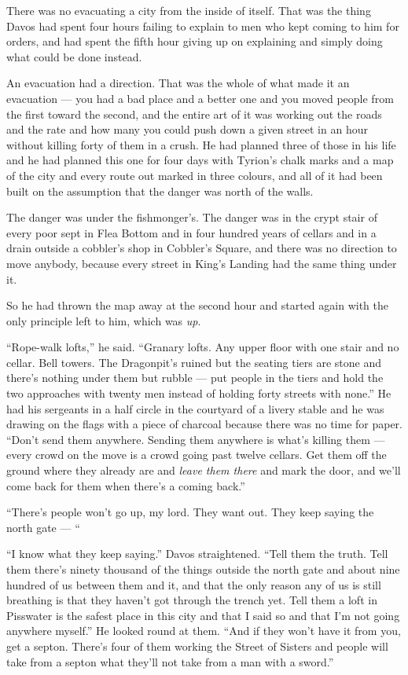 There was no evacuating a city from the inside of itself. That was the thing Davos had spent four hours failing to explain to men who kept coming to him for orders, and had spent the fifth hour giving up on explaining and simply doing what could be done instead.

An evacuation had a direction. That was the whole of what made it an evacuation — you had a bad place and a better one and you moved people from the first toward the second, and the entire art of it was working out the roads and the rate and how many you could push down a given street in an hour without killing forty of them in a crush. He had planned three of those in his life and he had planned this one for four days with Tyrion’s chalk marks and a map of the city and every route out marked in three colours, and all of it had been built on the assumption that the danger was north of the walls.

The danger was under the fishmonger’s. The danger was in the crypt stair of every poor sept in Flea Bottom and in four hundred years of cellars and in a drain outside a cobbler’s shop in Cobbler’s Square, and there was no direction to move anybody, because every street in King’s Landing had the same thing under it.

So he had thrown the map away at the second hour and started again with the only principle left to him, which was \textit{up}.

\sceneBreak

“Rope-walk lofts,” he said. “Granary lofts. Any upper floor with one stair and no cellar. Bell towers. The Dragonpit’s ruined but the seating tiers are stone and there’s nothing under them but rubble — put people in the tiers and hold the two approaches with twenty men instead of holding forty streets with none.” He had his sergeants in a half circle in the courtyard of a livery stable and he was drawing on the flags with a piece of charcoal because there was no time for paper. “Don’t send them anywhere. Sending them anywhere is what’s killing them — every crowd on the move is a crowd going past twelve cellars. Get them off the ground where they already are and \textit{leave them there} and mark the door, and we’ll come back for them when there’s a coming back.”

“There’s people won’t go up, my lord. They want out. They keep saying the north gate — “

“I know what they keep saying.” Davos straightened. “Tell them the truth. Tell them there’s ninety thousand of the things outside the north gate and about nine hundred of us between them and it, and that the only reason any of us is still breathing is that they haven’t got through the trench yet. Tell them a loft in Pisswater is the safest place in this city and that I said so and that I’m not going anywhere myself.” He looked round at them. “And if they won’t have it from you, get a septon. There’s four of them working the Street of Sisters and people will take from a septon what they’ll not take from a man with a sword.”

